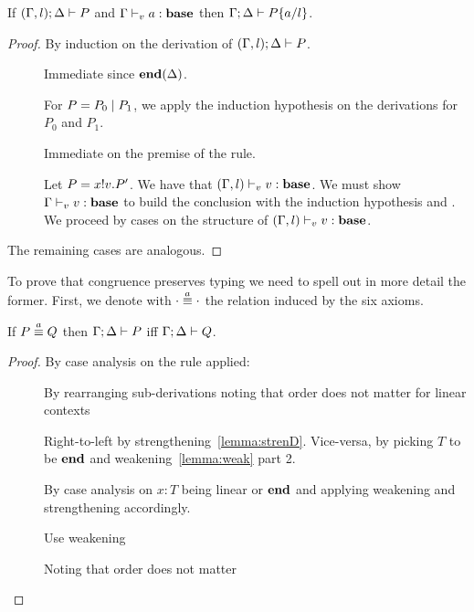 \begin{lemma}[Substitution]\mbox{}
  \label{le:subst}
  If $(\Gamma, l);\Delta \vdash P$ and
  ${\Gamma \vdash_v a : \mathbf{base}}$ then
  \( \Gamma;\Delta \vdash P\{a/l\} \).
\end{lemma}
\begin{proof}
  By induction on the derivation of $(\Gamma, l);\Delta \vdash P$.
  \begin{description}
  \item[] Immediate since $\mathbf{end}(\Delta)$.

  \item[] For $P = P_0 \mid P_1$, we apply the
    induction hypothesis on the derivations for $P_0$ and $P_1$.

  \item[] Immediate on the premise of the rule.

  \item[] Let $P = x ! v . P'$. We have that
    $(\Gamma, l) \vdash_v v : \mathbf{base}$.  We must show
    $\Gamma \vdash_v v : \mathbf{base}$ to build the conclusion with
    the induction hypothesis and . We proceed by cases
    on the structure of $(\Gamma, l) \vdash_v v : \mathbf{base}$.
  \end{description}
  The remaining cases are analogous.

\end{proof}

To prove that congruence preserves typing we need to spell out in more detail the former. First, we denote with $\cdot \stackrel{a}{\equiv} \cdot$ the relation induced by the six axioms.

\begin{lemma}
  \label{le:presequiva}
  If \( P \stackrel{a}{\equiv} Q \) then \( \Gamma;\Delta \vdash P \)  iff \( \Gamma;\Delta \vdash Q \).
\end{lemma}
\begin{proof}
  By case analysis on the  rule applied:
  \begin{description}
  \item[] By rearranging sub-derivations noting that
    order does not matter for linear contexts
  \item[]
   Right-to-left by strengthening~\ref{lemma:strenD}. Vice-versa,
    by picking $T$ to be $\mathbf{end}$ and weakening~\ref{lemma:weak} part 2.
  \item[] By case analysis on $x : T$ being linear or $\mathbf{end}$ and applying weakening and strengthening accordingly.
  \item[] Use weakening %
  \item[] Noting that order does not matter
  \end{description}
\end{proof}

